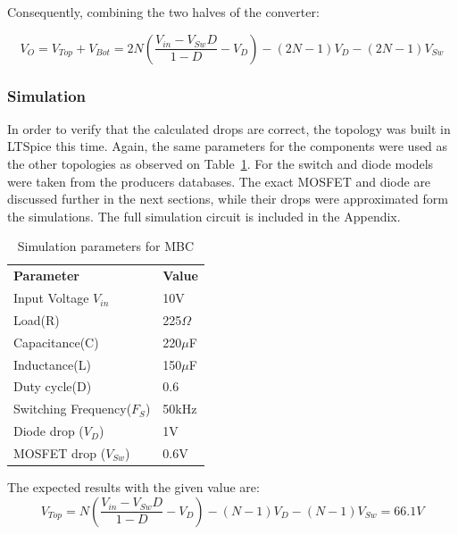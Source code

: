 Consequently, combining the two halves of the converter: 

\begin{equation}
	V_{O}=V_{Top}+V_{Bot}=2N( \frac{V_{in}-V_{Sw}D}{1-D}-V_D)-(2N-1)V_D-(2N-1)V_{Sw}
	\label{eq:DROPS_2INX_FINAL}
\end{equation}

\subsubsection{Simulation}
In order to verify that the calculated drops are correct,
the topology was built in LTSpice this time. 
Again, the same parameters for the components were used as the other topologies as observed on Table~\ref{tab:MBC_2Nx}. For the switch and diode models were taken from the producers databases. The exact MOSFET and diode are discussed further in the next sections, while their drops were approximated form the simulations. The full simulation circuit is included in the Appendix. 

\begin{table}[H]
\begin{center}
\caption {Simulation parameters for MBC} \label{tab:MBC_2Nx} 
\begin{tabular}{|l|l|}
\cline{1-2}
\textbf{Parameter} & \textbf{Value}  \\ \cline{1-2}
Input Voltage $V_{in}$          &      10V   \\ \cline{1-2}
Load(R)   & 225$\Omega$           \\ \cline{1-2}
Capacitance(C)          &       220$\mu$F     \\ \cline{1-2}
Inductance(L)          &      150$\mu$F      \\ \cline{1-2}
Duty cycle(D)          &     0.6       \\ \cline{1-2}
Switching Frequency($F_S$)          &      50kHz      \\ \cline{1-2}
Diode drop ($V_D$)          &     1V       \\ \cline{1-2}
MOSFET drop ($V_{Sw}$)          &     0.6V       \\ \cline{1-2}
\end{tabular}
\end{center}
\end{table}

The expected results with the given value are: 
\begin{equation}
	V_{Top}= N( \frac{V_{in}-V_{Sw}D}{1-D}-V_D)-(N-1)V_D-(N-1)V_{Sw}= 66.1V
	\label{eq:DROPS_NX_SIM}
\end{equation}

